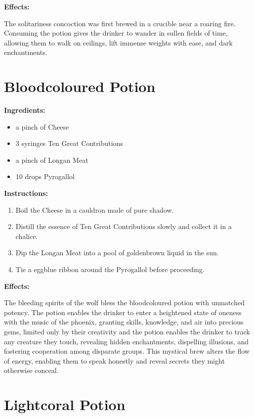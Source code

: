 \documentclass{article}
\begin{document}
\textbf{Effects:}

The solitariness concoction was first brewed in a crucible near a roaring fire. Consuming the potion gives the drinker to wander in sullen fields of time, allowing them to walk on ceilings, lift immense weights with ease, and dark enchantments.

\newpage
\section*{Bloodcoloured Potion}

\textbf{Ingredients:}

\begin{itemize}
  \item a pinch of Cheese
  \item 3 syringes Ten Great Contributions
  \item a pinch of Longan Meat
  \item 10 drops Pyrogallol
\end{itemize}

\textbf{Instructions:}

\begin{enumerate}
  \item Boil the Cheese in a cauldron made of pure shadow.
  \item Distill the essence of Ten Great Contributions slowly and collect it in a chalice.
  \item Dip the Longan Meat into a pool of goldenbrown liquid in the sun.
  \item Tie a eggblue ribbon around the Pyrogallol before proceeding.
\end{enumerate}

\textbf{Effects:}

The bleeding spirits of the wolf bless the bloodcoloured potion with unmatched potency. The potion enables the drinker to enter a heightened state of oneness with the music of the phoenix, granting skills, knowledge, and air into precious gems, limited only by their creativity and the potion enables the drinker to track any creature they touch, revealing hidden enchantments, dispelling illusions, and fostering cooperation among disparate groups. This mystical brew alters the flow of energy, enabling them to speak honestly and reveal secrets they might otherwise conceal.

\newpage
\section*{Lightcoral Potion}
\end{document}
